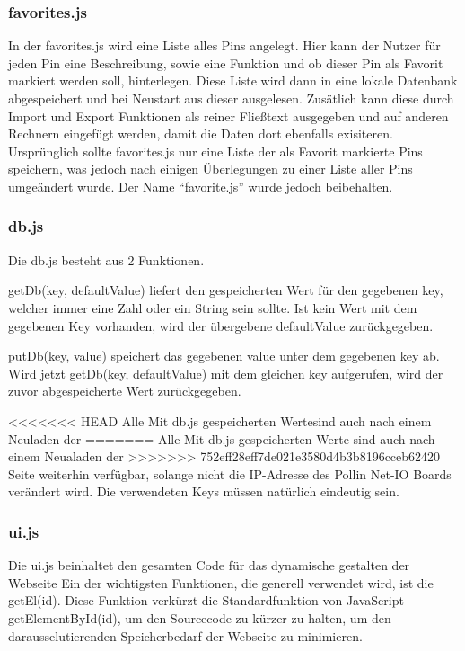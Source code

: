 \subsubsection{favorites.js}

In der favorites.js wird eine Liste alles Pins angelegt. Hier kann der Nutzer für jeden Pin eine
Beschreibung, sowie eine Funktion und ob dieser Pin als Favorit markiert werden soll, 
hinterlegen. Diese Liste wird dann in eine lokale Datenbank abgespeichert und bei Neustart aus dieser ausgelesen. 
Zusätlich kann diese durch Import und Export Funktionen als reiner Fließtext ausgegeben und auf anderen Rechnern 
eingefügt werden, damit die Daten dort ebenfalls exisiteren.\\
Ursprünglich sollte favorites.js nur eine Liste der als Favorit markierte Pins speichern, 
was jedoch nach einigen Überlegungen zu einer Liste aller Pins umgeändert wurde. Der Name 
"`favorite.js"' wurde jedoch beibehalten.

\subsubsection{db.js}
Die \textrm{db.js} besteht aus 2 Funktionen. 

\textrm{getDb(key, defaultValue)} liefert den gespeicherten Wert für den
gegebenen \textrm{key}, welcher immer eine Zahl oder ein String sein sollte. Ist
kein Wert mit dem gegebenen Key vorhanden, wird der
übergebene \textrm{defaultValue} zurückgegeben.

\textrm{putDb(key, value)} speichert das gegebenen \textrm{value} unter dem
gegebenen \textrm{key} ab. Wird jetzt \textrm{getDb(key, defaultValue)} mit dem
gleichen \textrm{key} aufgerufen, wird der zuvor abgespeicherte Wert
zurückgegeben.

<<<<<<< HEAD
Alle Mit \textrm{db.js} gespeicherten Wertesind auch nach einem Neuladen der
=======
Alle Mit \textrm{db.js} gespeicherten Werte sind auch nach einem Neualaden der
>>>>>>> 752eff28eff7de021e3580d4b3b8196cceb62420
Seite weiterhin verfügbar, solange nicht die IP-Adresse des Pollin Net-IO Boards
verändert wird. Die verwendeten Keys müssen natürlich eindeutig sein.

\subsubsection{ui.js}
Die \textrm{ui.js} beinhaltet den gesamten Code für das dynamische gestalten der
Webseite\newline
Ein der wichtigsten Funktionen, die generell verwendet wird, ist die
\textrm{getEl(id)}.
Diese Funktion verkürzt die Standardfunktion von JavaScript
\textrm{getElementById(id)}, um den Sourcecode zu kürzer zu halten,
um den darausselutierenden Speicherbedarf der Webseite zu
minimieren.\newline


